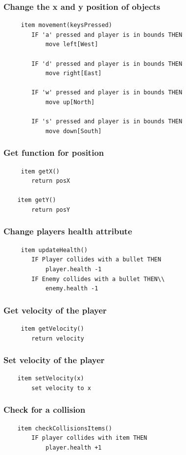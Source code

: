 \documentclass[12pt]{article}
\begin{document}
\subsubsection{Change the x and y position of objects}
\begin{verbatim}
     item movement(keysPressed)
        IF 'a' pressed and player is in bounds THEN
            move left[West]
       
        IF 'd' pressed and player is in bounds THEN
            move right[East]
      
        IF 'w' pressed and player is in bounds THEN
            move up[North]
      
        IF 's' pressed and player is in bounds THEN
            move down[South]
\end{verbatim}
\subsubsection{Get function for position}
\begin{verbatim}
     item getX()
        return posX
    
    item getY()
        return posY
\end{verbatim}
\subsubsection{Change players health attribute}
\begin{verbatim}
     item updateHealth()
        IF Player collides with a bullet THEN
            player.health -1
        IF Enemy collides with a bullet THEN\\
            enemy.health -1
\end{verbatim}
\subsubsection{Get velocity of the player}
\begin{verbatim}
     item getVelocity()
        return velocity
\end{verbatim}
\subsubsection{Set velocity of the player}
\begin{verbatim}
    item setVelocity(x)
        set velocity to x 
\end{verbatim}
\subsubsection{Check for a collision}
\begin{verbatim}
    item checkCollisionsItems()
        IF player collides with item THEN
            player.health +1
               
\end{verbatim}
\end{document}
